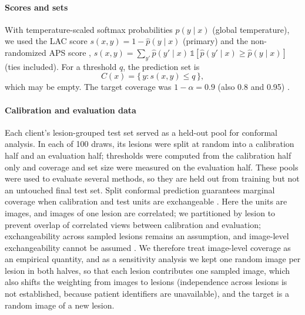 \documentclass[VANCOUVER,Times1COL]{WileyNJDv5}
\begin{document}
\paragraph{Scores and sets} With temperature-scaled softmax probabilities $\hat p(y\mid x)$ (global
temperature), we used the LAC score $s(x,y)=1-\hat p(y\mid x)$ \cite{sadinle2019lac} (primary) and the
non-randomized APS score \cite{romano2020aps}, $s(x,y)=\sum_{y'}\hat p(y'\mid x)\,\mathbb{1}[\hat
p(y'\mid x)\ge \hat p(y\mid x)]$ (ties included). For a threshold $q$, the prediction set is
\begin{equation}
  C(x)=\{\,y: s(x,y)\le q\,\},
  \label{eq:set}
\end{equation}
which may be empty. The target coverage was $1-\alpha=0.9$ (also 0.8 and 0.95)
\cite{angelopoulos2023gentle}.

\paragraph{Calibration and evaluation data} Each client's lesion-grouped test set served as a held-out
pool for conformal analysis. In each of 100 draws, its lesions were split at random into a calibration
half and an evaluation half; thresholds were computed from the calibration half only and coverage and set
size were measured on the evaluation half. These pools were used to evaluate several methods, so they are
held out from training but not an untouched final test set. Split conformal prediction guarantees
marginal coverage when calibration and test units are exchangeable
\cite{vovk2005algorithmic,angelopoulos2023gentle}. Here the units are images, and images of one lesion are
correlated; we partitioned by lesion to prevent overlap of correlated views between calibration and evaluation; exchangeability across sampled lesions remains an assumption, and image-level exchangeability cannot be assumed \cite{lee2023hierarchical,dunn2022hierarchical}. We therefore treat image-level coverage as an
empirical quantity, and as a sensitivity analysis we kept one random image per lesion in both halves, so
that each lesion contributes one sampled image, which also shifts the weighting from images to lesions (independence across lesions is not established, because patient identifiers are unavailable), and the target is a random image of a new
lesion.
\end{document}

